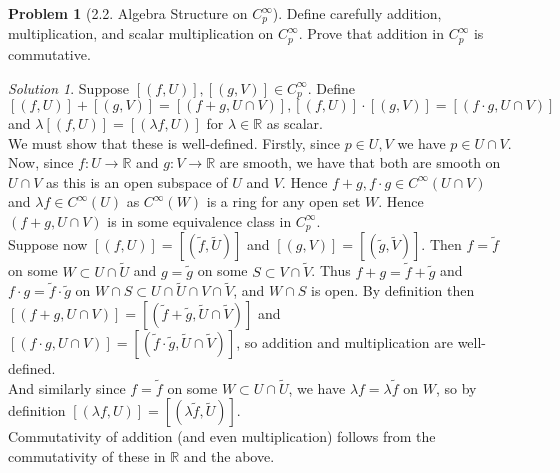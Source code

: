 \documentclass[reqno]{amsart}
\theoremstyle{plain}%
\theoremstyle{definition}
\newtheorem{problem}[theorem]{Problem}
\theoremstyle{remark}
\newtheorem*{solution}{Solution}
\begin{document}
\begin{problem}[2.2. Algebra Structure on $C_p^{\infty}$]
        Define carefully addition, multiplication, and scalar
        multiplication on $C_p^{\infty}$. Prove that addition
        in $C_p^{\infty}$ is commutative.
\end{problem}

\begin{solution}
    Suppose $\left[ \left( f,U \right) \right], \left[ \left( g,V \right)
    \right]
    \in C_{p}^{\infty}$. Define
    $\left[ \left( f,U \right) \right] + \left[ 
    \left( g,V \right) \right]
    = \left[ \left( f+g , U \cap V \right) \right] ,
    \left[ \left( f,U \right)  \right] 
    \cdot \left[ \left( g,V \right)  \right] 
    = \left[ \left( f \cdot g, U \cap V \right)  \right]$ and
    $\lambda \left[ \left( f,U \right)  \right] 
    = \left[ \left( \lambda f, U \right)  \right] $
    for $\lambda \in \mathbb{R}$ as scalar.\\
    We must show that these is well-defined. Firstly, 
    since $p \in U ,V$ we have $p \in U \cap V$. Now, since
    $f  \colon U \to \mathbb{R}$ and
    $g  \colon V \to \mathbb{R}$ are smooth, we have that both are
    smooth on  $U \cap V$ as this is an open subspace of
    $U$ and $V$. Hence $f+g, f\cdot g
    \in C^{\infty}\left( U \cap V \right) $ and
    $\lambda f \in C^{\infty} \left( U \right) $ as
    $C^{\infty}\left( W \right) $ is a ring for any open set $W$. Hence
    $\left( f+g, U \cap V \right)  $ is in some equivalence class
    in $C_p^{\infty}$.\\
    Suppose now $\left[ \left( f,U \right)  \right] 
    = \left[ \left( \tilde{f}, \tilde{U} \right)  \right] $ and
    $\left[ \left( g, V \right)  \right] = 
    \left[ \left( \tilde{g}, \tilde{V} \right)  \right] $. 
    Then $f = \tilde{f}$ on some $W \subset U \cap \tilde{U}$ and
    $g = \tilde{g}$ on some $S \subset V \cap \tilde{V}$. Thus
    $f+g = \tilde{f}+ \tilde{g}$ and
    $f \cdot g = \tilde{f} \cdot \tilde{g}$ on 
    $W \cap S \subset U \cap \tilde{U} \cap V \cap \tilde{V}$, and
    $W \cap S$ is open.
    By definition then
    $\left[ \left( f+g, U \cap V \right)  \right] 
    = \left[ \left( \tilde{f}+ \tilde{g},
    \tilde{U} \cap \tilde{V} \right)  \right] $ and
    $\left[ \left( f\cdot g, U \cap V \right)  \right] 
    = \left[ \left( \tilde{f}\cdot \tilde{g},
    \tilde{U} \cap \tilde{V} \right)  \right] $, so
    addition and multiplication are well-defined.\\
    And similarly since $f = \tilde{f}$ on some $W 
    \subset U \cap \tilde{U}$, we have
    $\lambda f = \lambda \tilde{f}$ on
    $W$, so by definition
    $\left[ \left( \lambda f, U \right)  \right] 
    = \left[ \left( \lambda \tilde{f}, \tilde{U} \right)  \right] $.\\
    \linebreak
    Commutativity of addition (and even multiplication) follows
    from the commutativity of these in $\mathbb{R}$ and the above.
\end{solution}
\end{document}
